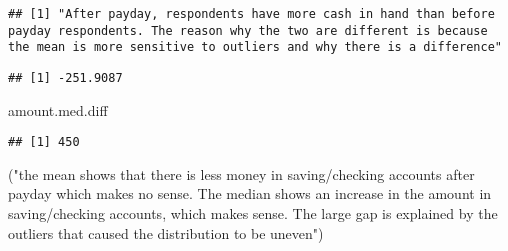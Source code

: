\documentclass[
]{article}
\newenvironment{Shaded}{\begin{snugshade}}{\end{snugshade}}
\newcommand{\DataTypeTok}[1]{\textcolor[rgb]{0.13,0.29,0.53}{#1}}
\newcommand{\KeywordTok}[1]{\textcolor[rgb]{0.13,0.29,0.53}{\textbf{#1}}}
\newcommand{\NormalTok}[1]{#1}
\newcommand{\OperatorTok}[1]{\textcolor[rgb]{0.81,0.36,0.00}{\textbf{#1}}}
\newcommand{\OtherTok}[1]{\textcolor[rgb]{0.56,0.35,0.01}{#1}}
\newcommand{\StringTok}[1]{\textcolor[rgb]{0.31,0.60,0.02}{#1}}
\begin{document}
\begin{verbatim}
## [1] "After payday, respondents have more cash in hand than before payday respondents. The reason why the two are different is because the mean is more sensitive to outliers and why there is a difference"
\end{verbatim}

\begin{Shaded}
\end{Shaded}

\begin{verbatim}
## [1] -251.9087
\end{verbatim}

\begin{Shaded}
\begin{Highlighting}[]
\NormalTok{amount.med.diff}
\end{Highlighting}
\end{Shaded}

\begin{verbatim}
## [1] 450
\end{verbatim}

\begin{Shaded}
\begin{Highlighting}[]
\NormalTok{(}\StringTok{"the mean shows that there is less money in saving/checking accounts after payday which makes no sense. The median shows an increase in the amount in saving/checking accounts, which makes sense. The large gap is explained by the outliers that caused the distribution to be uneven"}\NormalTok{)}
\end{Highlighting}
\end{Shaded}
\end{document}

